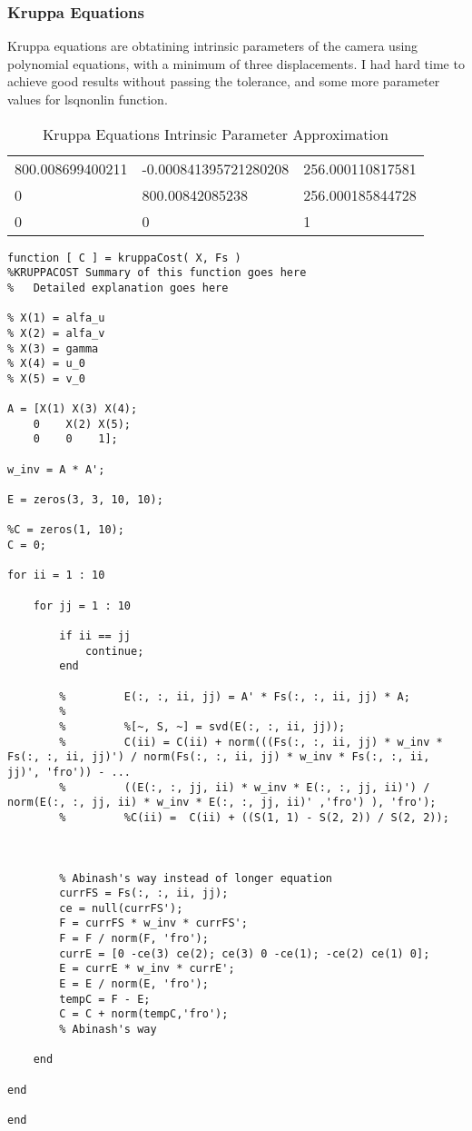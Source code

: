 \documentclass{article}
\begin{document}
	\subsubsection{Kruppa Equations}
		Kruppa equations are obtatining intrinsic parameters of the camera using polynomial equations, with a minimum of three displacements. 
		I had hard time to achieve good results without passing the tolerance, and some more parameter values for lsqnonlin function. 
		
			\begin{table}[H]
	\centering
    \begin{tabular}{lll}
    800.008699400211 & -0.000841395721280208 & 256.000110817581 \\
    0                & 800.00842085238    & 256.000185844728 \\
    0                & 0                    & 1                \\
    \end{tabular}
    \caption {Kruppa Equations Intrinsic Parameter Approximation}
	\end{table}
		
		\begin{lstlisting}[label=kruppa-equations-cost, caption=Kruppa Equations Cost]
function [ C ] = kruppaCost( X, Fs )
%KRUPPACOST Summary of this function goes here
%   Detailed explanation goes here

% X(1) = alfa_u
% X(2) = alfa_v
% X(3) = gamma
% X(4) = u_0
% X(5) = v_0

A = [X(1) X(3) X(4);
    0    X(2) X(5);
    0    0    1];

w_inv = A * A';

E = zeros(3, 3, 10, 10);

%C = zeros(1, 10);
C = 0;

for ii = 1 : 10
    
    for jj = 1 : 10
        
        if ii == jj
            continue;
        end
        
        %         E(:, :, ii, jj) = A' * Fs(:, :, ii, jj) * A;
        %         
        %         %[~, S, ~] = svd(E(:, :, ii, jj));
        %         C(ii) = C(ii) + norm(((Fs(:, :, ii, jj) * w_inv * Fs(:, :, ii, jj)') / norm(Fs(:, :, ii, jj) * w_inv * Fs(:, :, ii, jj)', 'fro')) - ...
        %         ((E(:, :, jj, ii) * w_inv * E(:, :, jj, ii)') / norm(E(:, :, jj, ii) * w_inv * E(:, :, jj, ii)' ,'fro') ), 'fro');
        %         %C(ii) =  C(ii) + ((S(1, 1) - S(2, 2)) / S(2, 2));
        
        
        
        % Abinash's way instead of longer equation
        currFS = Fs(:, :, ii, jj);
        ce = null(currFS');
        F = currFS * w_inv * currFS';
        F = F / norm(F, 'fro');
        currE = [0 -ce(3) ce(2); ce(3) 0 -ce(1); -ce(2) ce(1) 0];
        E = currE * w_inv * currE';
        E = E / norm(E, 'fro');
        tempC = F - E;
        C = C + norm(tempC,'fro');
        % Abinash's way
        
    end
    
end

end
\end{lstlisting}  			
\end{document}
